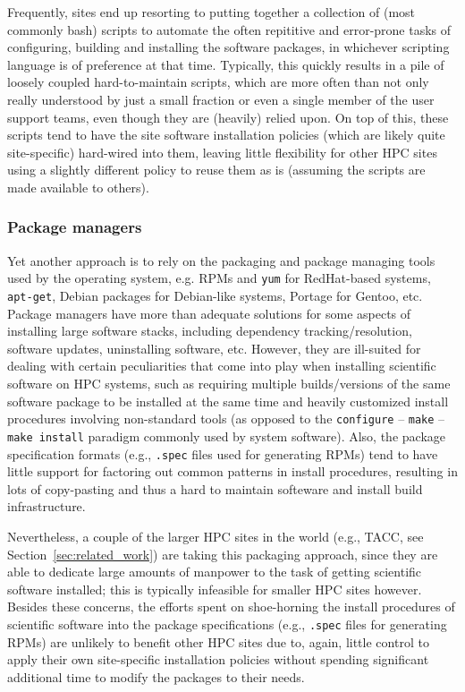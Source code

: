 Frequently, sites end up resorting to putting together a collection of (most
commonly bash) scripts to automate the often repititive and error-prone tasks of
configuring, building and installing the software packages, in whichever scripting
language is of preference at that time. Typically, this quickly results in a pile of
loosely coupled hard-to-maintain scripts, which are more often than not only really
understood by just a small fraction or even a single member of the user support
teams, even though they are (heavily) relied upon.
On top of this, these scripts
tend to have the site software installation policies (which are likely quite
site-specific) hard-wired into them, leaving little flexibility for other HPC
sites using a slightly different policy to reuse them as is (assuming the scripts
are made available to others).

\subsubsection{Package managers}

Yet another approach is to rely on the packaging and package managing tools used
by the operating system, e.g. RPMs and \texttt{yum} for RedHat-based systems,
\texttt{apt-get}, Debian packages for Debian-like systems, Portage for Gentoo, etc.
Package managers have more than adequate solutions for some aspects of
installing large software stacks, including dependency tracking/resolution, software
updates, uninstalling software, etc. However, they are ill-suited for dealing with
certain peculiarities that come into play when installing scientific software on
HPC systems, such as requiring multiple builds/versions of the same software package
to be installed at the same time and heavily customized install procedures involving
non-standard tools (as opposed to the
\texttt{configure} -- \texttt{make} -- \texttt{make install} paradigm commonly used
by system software). Also, the package specification formats (e.g., \texttt{.spec}
files used for generating RPMs) tend to have little support for factoring out
common patterns in install procedures, resulting in lots of copy-pasting and thus
a hard to maintain softeware and install build infrastructure.

Nevertheless, a couple of the larger HPC sites in the world
(e.g., TACC, see Section~\ref{sec:related_work}) are taking this packaging approach,
since they are able to dedicate large amounts of manpower to the task of getting
scientific software installed; this is typically infeasible for smaller HPC sites
however. Besides these concerns, the efforts spent on shoe-horning the install
procedures of scientific software into the package specifications (e.g., 
\texttt{.spec} files for generating RPMs) are unlikely to benefit other HPC sites
due to, again, little control to apply their own site-specific installation
policies without spending significant additional time to modify the packages to
their needs.

